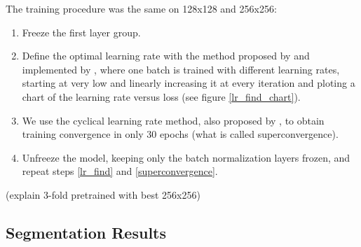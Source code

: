 \documentclass[conference]{IEEEtran}
\begin{document}
The training procedure was the same on 128x128 and 256x256:
\begin{enumerate}
  \item Freeze the first layer group.
  \item \label{lr_find}Define the optimal learning rate with the method proposed by \cite{leslie} and implemented by \cite{fastai}, where one batch is trained with different learning rates, starting at very low and linearly increasing it at every iteration and ploting a chart of the learning rate versus loss (see figure \ref{lr_find_chart}).
  \item \label{superconvergence}We use the cyclical learning rate method, also proposed by \cite{leslie}, to obtain training convergence in only 30 epochs (what is called superconvergence).
  \item Unfreeze the model, keeping only the batch normalization layers frozen, and repeat steps \ref{lr_find} and \ref{superconvergence}.
\end{enumerate}

(explain 3-fold pretrained with best 256x256)

\subsection{Segmentation Results}
\end{document}
